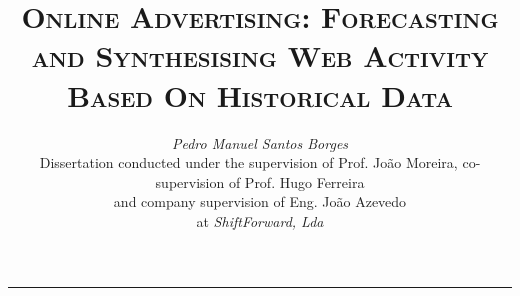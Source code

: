 \documentclass[9pt,a4paper]{extarticle}
\begin{document}
\title{\vspace*{-8mm}\textbf{\textsc{Online Advertising: Forecasting and Synthesising Web Activity Based On Historical Data}}}
\author{\emph{Pedro Manuel Santos Borges}\\[2mm]
\small{Dissertation conducted under the supervision of Prof. João Moreira, co-supervision of Prof. Hugo Ferreira}\\
\small{and company supervision of Eng. João Azevedo}\\
\small{at \emph{ShiftForward, Lda}}}
\date{}
\maketitle
\thispagestyle{empty}

\vspace*{-4mm}\noindent\rule{\textwidth}{0.4pt}\vspace*{4mm}
\end{document}
